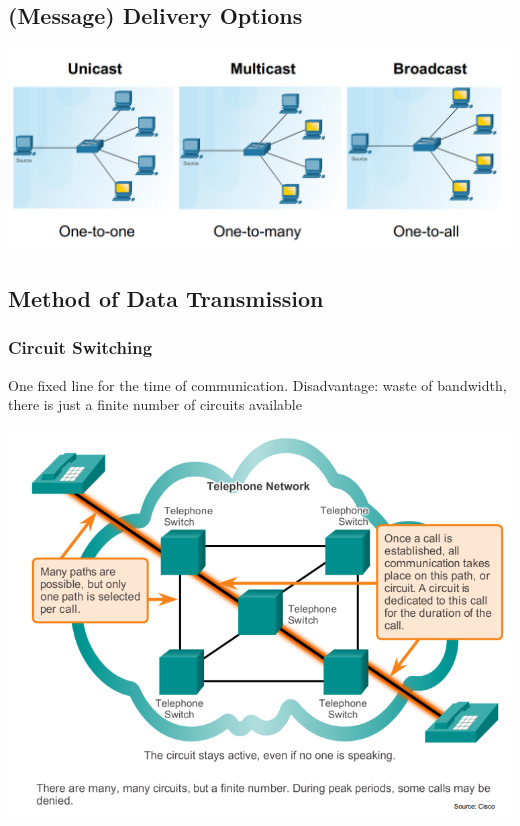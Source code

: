 \documentclass[11pt]{article}
\begin{document}
\subsection{(Message) Delivery Options}
    \includegraphics[width=\textwidth]{message-delivery-options}
\subsection{Method of Data Transmission}
    \subsubsection{Circuit Switching}
        One fixed line for the time of communication.
        Disadvantage: waste of bandwidth, there is just a finite number of circuits available
        
        \includegraphics[width=\textwidth]{circuit-switching}
\end{document}
